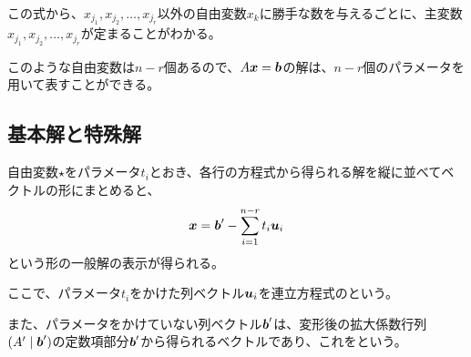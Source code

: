 \documentclass[../../../topic_linear-algebra]{subfiles}
\begin{document}
\br

この式から、$x_{j_1}, x_{j_2}, \dots, x_{j_r}$以外の自由変数$x_k$に勝手な数を与えるごとに、主変数$x_{j_1}, x_{j_2}, \dots, x_{j_r}$が定まることがわかる。

\br

このような自由変数は$n-r$個あるので、$A\vb*{x} = \vb*{b}$の解は、$n-r$個のパラメータを用いて表すことができる。

\subsection{基本解と特殊解}\label{sec:fundamental-and-particular-solutions}

自由変数$\star$をパラメータ$t_i$とおき、各行の方程式から得られる解を縦に並べてベクトルの形にまとめると、
\begin{equation*}
  \vb*{x} = \vb*{b}' - \sum_{i=1}^{n-r} t_i \vb*{u}_i
\end{equation*}
という形の一般解の表示が得られる。

\br

ここで、パラメータ$t_i$をかけた列ベクトル$\vb*{u}_i$を連立方程式のという。

また、パラメータをかけていない列ベクトル$\vb*{b}'$は、変形後の拡大係数行列$(A' \mid \vb*{b}')$の定数項部分$\vb*{b}'$から得られるベクトルであり、これをという。
\end{document}
